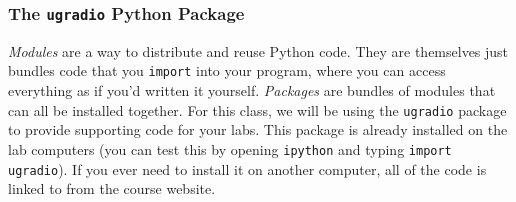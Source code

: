 \documentclass[12pt,preprint]{aastex}
\begin{document}
%
%
%
%
%
\subsubsection{The {\tt ugradio} Python Package}

{\it Modules} are a way to distribute and reuse Python code.  They are themselves
just bundles code that you {\tt import} into your program, where you can
access everything as if you'd written it yourself.  {\it Packages} are bundles
of modules that can all be installed together.  For this class, we will be using
the {\tt ugradio} package to provide supporting code for your labs.  This package
is already installed on the lab computers (you can test this by opening {\tt ipython}
and typing {\tt import ugradio}).  If you ever need to install it on another computer,
all of the code is linked to from the course website.  
\end{document}
